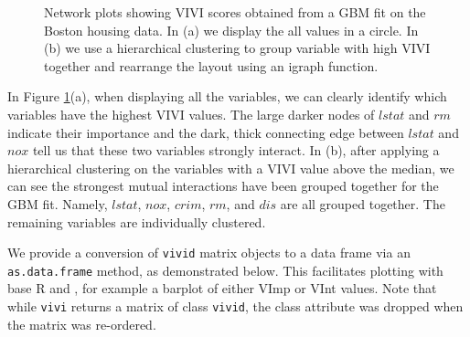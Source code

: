 \begin{figure}

{\centering {}

}

\caption{Network plots showing VIVI scores obtained from a GBM fit on the Boston housing data. In (a) we display the all values in a circle. In (b) we use a hierarchical clustering to group variable with high VIVI together and rearrange the layout using an igraph function.}\label{fig:networks1}
\end{figure}

In Figure \ref{fig:networks1}(a), when displaying all the variables, we can clearly identify which variables have the highest VIVI values. The large darker nodes of \(lstat\) and \(rm\) indicate their importance and the dark, thick connecting edge between \(lstat\) and \(nox\) tell us that these two variables strongly interact. In (b), after applying a hierarchical clustering on the variables with a VIVI value above the median, we can see the strongest mutual interactions have been grouped together for the GBM fit. Namely, \(lstat\), \(nox\), \(crim\), \(rm\), and \(dis\) are all grouped together. The remaining variables are individually clustered.

We provide a conversion of \texttt{vivid} matrix objects to a data frame via an \texttt{as.data.frame} method, as demonstrated below. This facilitates plotting with base R and , for example a barplot of either VImp or VInt values. Note that while \texttt{vivi} returns a matrix of class \texttt{vivid}, the class attribute was dropped when the matrix was re-ordered.

